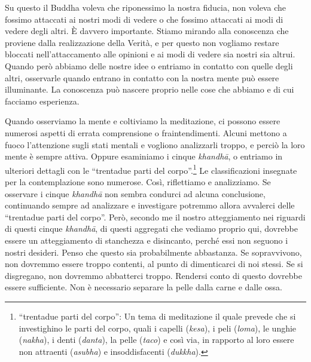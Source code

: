 Su questo il Buddha voleva che riponessimo la nostra fiducia, non voleva
che fossimo attaccati ai nostri modi di vedere o che fossimo attaccati
ai modi di vedere degli altri. È davvero importante. Stiamo mirando alla
conoscenza che proviene dalla realizzazione della Verità, e per questo
non vogliamo restare bloccati nell'attaccamento alle opinioni e ai modi
di vedere sia nostri sia altrui. Quando però abbiamo delle nostre idee o
entriamo in contatto con quelle degli altri, osservarle quando entrano
in contatto con la nostra mente può essere illuminante. La conoscenza
può nascere proprio nelle cose che abbiamo e di cui facciamo esperienza.

Quando osserviamo la mente e coltiviamo la meditazione, ci possono
essere numerosi aspetti di errata comprensione o fraintendimenti. Alcuni
mettono a fuoco l'attenzione sugli stati mentali e vogliono analizzarli
troppo, e perciò la loro mente è sempre attiva. Oppure esaminiamo i
cinque \emph{khandhā}, o entriamo in ulteriori dettagli con le
``trentadue parti del corpo''.\footnote{``trentadue parti del corpo'':
  Un tema di meditazione il quale prevede che si investighino le parti
  del corpo, quali i capelli (\emph{kesa}), i peli (\emph{loma}), le
  unghie (\emph{nakha}), i denti (\emph{danta}), la pelle (\emph{taco})
  e così via, in rapporto al loro essere non attraenti (\emph{asubha}) e
  insoddisfacenti (\emph{dukkha}).} Le classificazioni insegnate per la
contemplazione sono numerose. Così, riflettiamo e analizziamo. Se
osservare i cinque \emph{khandhā} non sembra condurci ad alcuna
conclusione, continuando sempre ad analizzare e investigare potremmo
allora avvalerci delle ``trentadue parti del corpo''. Però, secondo me
il nostro atteggiamento nei riguardi di questi cinque \emph{khandhā}, di
questi aggregati che vediamo proprio qui, dovrebbe essere un
atteggiamento di stanchezza e disincanto, perché essi non seguono i
nostri desideri. Penso che questo sia probabilmente abbastanza. Se
sopravvivono, non dovremmo essere troppo contenti, al punto di
dimenticarci di noi stessi. Se si disgregano, non dovremmo abbatterci
troppo. Rendersi conto di questo dovrebbe essere sufficiente. Non è
necessario separare la pelle dalla carne e dalle ossa.

